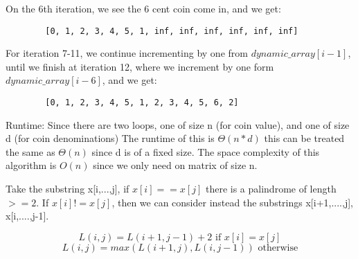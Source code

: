 \documentclass[12pt]{article}
\newenvironment{question}[2][Question]{\begin{trivlist}
		\item[\hskip \labelsep {\bfseries #1}\hskip \labelsep {\bfseries #2.}]}{\end{trivlist}}
\begin{document}
\begin{question}{1d}
		On the 6th iteration, we see the 6 cent coin come in, and we get:
		\begin{lstlisting}
		[0, 1, 2, 3, 4, 5, 1, inf, inf, inf, inf, inf, inf]		
		\end{lstlisting}
		
		For iteration 7-11, we continue incrementing by one from $dynamic\_array[i-1]$, until we finish at iteration 12, where we increment by one form $dynamic\_array[i-6]$, and we get:
		\begin{lstlisting}
		[0, 1, 2, 3, 4, 5, 1, 2, 3, 4, 5, 6, 2]		
		\end{lstlisting}
		

		
		
		Runtime: Since there are two loops, one of size n (for coin value), and one of size d (for coin denominations) The runtime of this is $\Theta(n*d)$ this can be treated the same as $\Theta(n)$ since d is of a fixed size. The space complexity of this algorithm is $O(n)$ since we only need on matrix of size n.
			\end{question}
	\begin{question}{3a}
		
		Take the substring x[i,...,j], if $x[i]==x[j]$ there is a palindrome of length $>=2$. If $x[i] != x[j]$, then we can consider instead the substrings x[i+1,....,j], x[i,....,j-1].
		
			$$L(i, j) = L (i+1, j-1) + 2 \text{ if } x[i]=x[j]$$
			$$L(i, j) = max(L(i+1, j), L(i,j-1 )) \text{ otherwise}$$
	
	\end{question}
\end{document}
